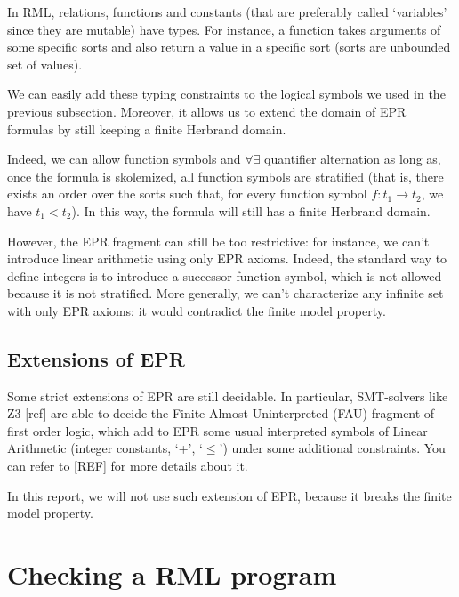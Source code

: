\documentclass[11pt,a4paper,oldfontcommands]{memoir}
\begin{document}
        In RML, relations, functions and constants (that are preferably called `variables' since they are mutable) have types.
        For instance, a function takes arguments of some specific sorts and also return a value in a specific sort (sorts are unbounded set of values).

        We can easily add these typing constraints to the logical symbols we used in the previous subsection.
        Moreover, it allows us to extend the domain of EPR formulas by still keeping a finite Herbrand domain.

        Indeed, we can allow function symbols and \(\forall\exists\) quantifier alternation as long as,
        once the formula is skolemized, all function symbols are stratified (that is, there exists
        an order over the sorts such that, for every function symbol \( f: t_1 \to t_2 \), we have \( t_1 < t_2 \)).
        In this way, the formula will still has a finite Herbrand domain.

        However, the EPR fragment can still be too restrictive: for instance, we can't introduce linear arithmetic using only EPR axioms.
        Indeed, the standard way to define integers is to introduce a successor function symbol, which is not allowed because it is not stratified.
        More generally, we can't characterize any infinite set with only EPR axioms: it would contradict the finite model property.

        \subsection{Extensions of EPR}

        Some strict extensions of EPR are still decidable.
        In particular, SMT-solvers like Z3 [ref] are able to decide the Finite Almost Uninterpreted (FAU) fragment of first order logic,
        which add to EPR some usual interpreted symbols of Linear Arithmetic (integer constants, `+', `\( \leq \)') under some additional constraints.
        You can refer to [REF] for more details about it. 
        
        In this report, we will not use such extension of EPR, because it breaks the finite model property.
    
    \section{Checking a RML program}
\end{document}
